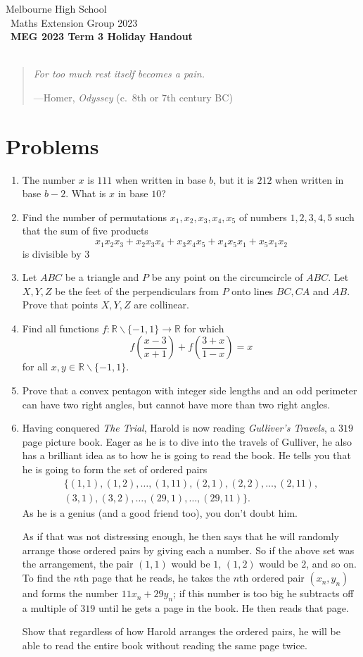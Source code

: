 \documentclass[a4paper]{article}
\title{{\thepdftitle}}
\author{Nathan Wong\and Tom Yan}
\date{2023}
\newcommand{\thedisplaytitle}{MEG 2023 Term 3 Holiday Handout}
\newcommand{\marginnote}[1]{\marginpar{\footnotesize{#1}}}
\let\mathbbalt\mathbb
\let\mathbb\mathbbalt
\newcommand{\myquote}[2]{%
  \begin{quote}
    \emph{#1}
    \begin{flushright}---{#2}
    \end{flushright}
  \end{quote}}
\begin{document}
\noindent Melbourne High School\\\
\noindent Maths Extension Group 2023\\\
\noindent \textbf{\thedisplaytitle}\\\
\myquote{For too much rest itself becomes a pain.}{Homer, \emph{Odyssey} (c.~8th or 7th century BC)}
\section*{Problems}
\begin{enumerate}
	\item The \marginnote{AIMO 2017/1} number $x$ is $111$ when written in base $b$, but it is $212$ when written in base $b-2$. What is $x$ in base $10$? 
	\item Find \marginnote{AIME II 2021/3} the number of permutations $x_1, x_2, x_3, x_4, x_5$ of numbers $1, 2, 3, 4, 5$ such that the sum of five products\[x_1x_2x_3 + x_2x_3x_4 + x_3x_4x_5 + x_4x_5x_1 + x_5x_1x_2\]is divisible by $3$
	\item Let \marginnote{Simson Line} $ABC$ be a triangle and $P$ be any point on the circumcircle of $ABC$. Let $X, Y, Z$ be the feet of the perpendiculars from $P$ onto lines $BC, CA$ and $AB$. Prove that points $X, Y, Z$ are collinear.
	\item Find all functions $f: \mathbb{R} \backslash \{-1, 1\} \rightarrow \mathbb{R} $ for which $$f\left(\frac{x-3}{x+1}\right)+f\left(\frac{3+x}{1-x}\right)=x$$ for all $x,y \in \mathbb{R} \backslash \{-1, 1\}$. 
	\item Prove \marginnote{AMO 2022/1} that a convex pentagon with integer side lengths and an odd perimeter can have two right angles, but cannot have more than two right angles.  
	\item Having conquered \emph{The Trial}, Harold is now reading
		\emph{Gulliver's Travels}, a \(319\) page picture book.
		Eager as he is to dive into
		the travels of Gulliver, he also has a brilliant idea
		as to how he is going to read the book. 
		He tells you that he is going to form the set of ordered
		pairs 
		\[
			\begin{split}
				\{(1,1),(1,2),\ldots,(1,11),(2,1),(2,2),\ldots,(2,11),\\(3,1),(3,2),\ldots,(29,1),\ldots,(29,11)\}.
			\end{split}\]
		As he is a genius (and a good friend too), you don't doubt him.

		As if that was not distressing enough, he then says that he
		will randomly arrange those ordered pairs by giving each
		a number. So if the above set was the arrangement, the
		pair \((1,1)\) would be \(1\), \((1,2)\) would be \(2\),
		and so on. To find the \(n\)th page that he reads, he
		takes the \(n\)th ordered pair \((x_n,y_n)\) and forms
		the number \(11x_n+29y_n\); if this number is too big
		he subtracts off a multiple of \(319\) until he gets
		a page in the book. He then reads that page.

		Show that regardless of how Harold arranges the ordered
		pairs, he will be able to read the entire book without
		reading the same page twice.
		
\end{enumerate}
\end{document}
